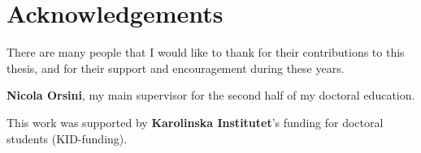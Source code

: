 %

\chapter{Acknowledgements}

There are many people that I would like to thank for their contributions to this thesis, and for their support and encouragement during these years.

\bigskip

\textbf{Nicola Orsini}, my main supervisor for the second half of my doctoral education.

\bigskip

\noindent This work was supported by \textbf{Karolinska Institutet}'s funding for doctoral students (KID-funding).





